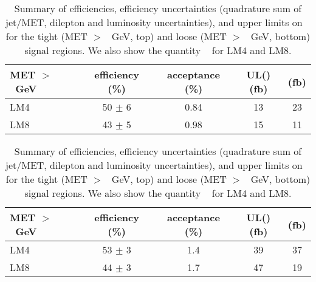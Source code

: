 \begin{table}[hbt]
  \begin{center}
	\caption{
	  \label{tab:models} 
	  Summary of efficiencies, efficiency uncertainties (quadrature sum
	  of jet/MET, dilepton and luminosity uncertainties), 
	  and upper limits on \sta\ %
	  for the tight (MET $>$ \signalmett~GeV, top)
	  and loose (MET $>$ \signalmetl~GeV, bottom) signal regions.
	  We also show the quantity
	  \sta\ %
	  for LM4 and LM8.}

	\medskip
	\begin{tabular}{l|cccc}
	  \hline
	  \bf MET $>$ \signalmett~GeV & efficiency (\%) & acceptance (\%) & UL(\sta)(fb) & \sta(fb) \\
	  \hline
	  LM4  &  50 $\pm$   6  &  0.84  &  13  &  23  \\
	  LM8  &  43 $\pm$   5  &  0.98  &  15  &  11  \\

	  \hline
	\end{tabular}

	\medskip
	\begin{tabular}{l|cccc}
	  \hline
	  \bf MET $>$ \signalmetl~GeV & efficiency (\%) & acceptance (\%) & UL(\sta)(fb) & \sta(fb) \\
	  \hline
	  LM4 &  53 $\pm$   3  &  1.4  &   39  &   37  \\
	  LM8 &  44 $\pm$   3  &  1.7  &   47  &   19  \\

	  \hline
	\end{tabular}

	\begin{comment}

	  \begin{tabular}{l|ccc}

		\hline
		& $t\bar{t}$    & LM4     & LM8       \\
		\hline
			{\bf Loose signal region}                &               &         &           \\
			Efficiency                               &       0.43    & 0.54    & 0.45      \\
			Efficiency Uncertainty                   &       0.15    & 0.12    & 0.12      \\
			UL($\sigma \times BF \times A$) (pb)     &       0.56    & 0.44    & 0.53      \\
			$\sigma \times BF \times A$ (pb)         &               & 0.045   & 0.025     \\


\end{comment}
\end{center}
\end{table}

